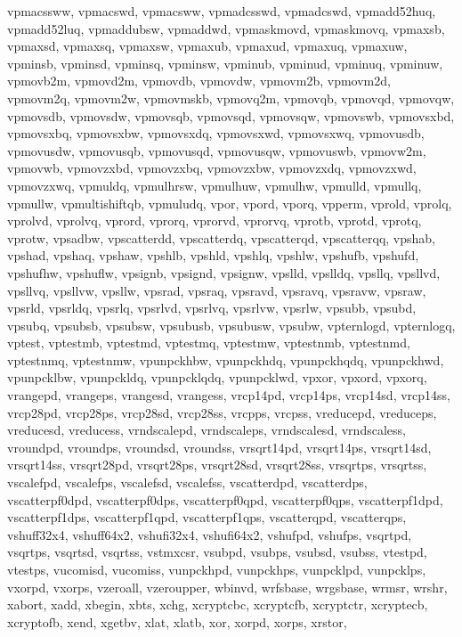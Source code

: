 {{vpmacssww, vpmacswd, vpmacsww, vpmadcsswd, vpmadcswd, vpmadd52huq, vpmadd52luq,
vpmaddubsw, vpmaddwd, vpmaskmovd, vpmaskmovq, vpmaxsb, vpmaxsd, vpmaxsq,
vpmaxsw, vpmaxub, vpmaxud, vpmaxuq, vpmaxuw, vpminsb, vpminsd, vpminsq, vpminsw,
vpminub, vpminud, vpminuq, vpminuw, vpmovb2m, vpmovd2m, vpmovdb, vpmovdw,
vpmovm2b, vpmovm2d, vpmovm2q, vpmovm2w, vpmovmskb, vpmovq2m, vpmovqb, vpmovqd,
vpmovqw, vpmovsdb, vpmovsdw, vpmovsqb, vpmovsqd, vpmovsqw, vpmovswb, vpmovsxbd,
vpmovsxbq, vpmovsxbw, vpmovsxdq, vpmovsxwd, vpmovsxwq, vpmovusdb, vpmovusdw,
vpmovusqb, vpmovusqd, vpmovusqw, vpmovuswb, vpmovw2m, vpmovwb, vpmovzxbd,
vpmovzxbq, vpmovzxbw, vpmovzxdq, vpmovzxwd, vpmovzxwq, vpmuldq, vpmulhrsw,
vpmulhuw, vpmulhw, vpmulld, vpmullq, vpmullw, vpmultishiftqb, vpmuludq, vpor,
vpord, vporq, vpperm, vprold, vprolq, vprolvd, vprolvq, vprord, vprorq, vprorvd,
vprorvq, vprotb, vprotd, vprotq, vprotw, vpsadbw, vpscatterdd, vpscatterdq,
vpscatterqd, vpscatterqq, vpshab, vpshad, vpshaq, vpshaw, vpshlb, vpshld,
vpshlq, vpshlw, vpshufb, vpshufd, vpshufhw, vpshuflw, vpsignb, vpsignd, vpsignw,
vpslld, vpslldq, vpsllq, vpsllvd, vpsllvq, vpsllvw, vpsllw, vpsrad, vpsraq,
vpsravd, vpsravq, vpsravw, vpsraw, vpsrld, vpsrldq, vpsrlq, vpsrlvd, vpsrlvq,
vpsrlvw, vpsrlw, vpsubb, vpsubd, vpsubq, vpsubsb, vpsubsw, vpsubusb, vpsubusw,
vpsubw, vpternlogd, vpternlogq, vptest, vptestmb, vptestmd, vptestmq, vptestmw,
vptestnmb, vptestnmd, vptestnmq, vptestnmw, vpunpckhbw, vpunpckhdq, vpunpckhqdq,
vpunpckhwd, vpunpcklbw, vpunpckldq, vpunpcklqdq, vpunpcklwd, vpxor, vpxord,
vpxorq, vrangepd, vrangeps, vrangesd, vrangess, vrcp14pd, vrcp14ps, vrcp14sd,
vrcp14ss, vrcp28pd, vrcp28ps, vrcp28sd, vrcp28ss, vrcpps, vrcpss, vreducepd,
vreduceps, vreducesd, vreducess, vrndscalepd, vrndscaleps, vrndscalesd,
vrndscaless, vroundpd, vroundps, vroundsd, vroundss, vrsqrt14pd, vrsqrt14ps,
vrsqrt14sd, vrsqrt14ss, vrsqrt28pd, vrsqrt28ps, vrsqrt28sd, vrsqrt28ss,
vrsqrtps, vrsqrtss, vscalefpd, vscalefps, vscalefsd, vscalefss, vscatterdpd,
vscatterdps, vscatterpf0dpd, vscatterpf0dps, vscatterpf0qpd, vscatterpf0qps,
vscatterpf1dpd, vscatterpf1dps, vscatterpf1qpd, vscatterpf1qps, vscatterqpd,
vscatterqps, vshuff32x4, vshuff64x2, vshufi32x4, vshufi64x2, vshufpd, vshufps,
vsqrtpd, vsqrtps, vsqrtsd, vsqrtss, vstmxcsr, vsubpd, vsubps, vsubsd, vsubss,
vtestpd, vtestps, vucomisd, vucomiss, vunpckhpd, vunpckhps, vunpcklpd,
vunpcklps, vxorpd, vxorps, vzeroall, vzeroupper, wbinvd, wrfsbase, wrgsbase,
wrmsr, wrshr, xabort, xadd, xbegin, xbts, xchg, xcryptcbc, xcryptcfb, xcryptctr,
xcryptecb, xcryptofb, xend, xgetbv, xlat, xlatb, xor, xorpd, xorps, xrstor,
}}
